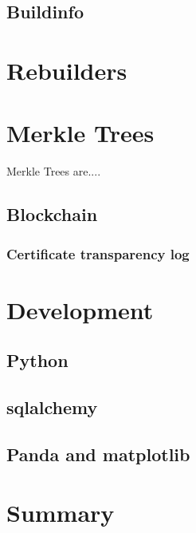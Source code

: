 \documentclass[../Main/thesis.tex]{subfiles}
\begin{document}
    \subsection*{Buildinfo}

\section{Rebuilders}\label{sec:rebuilders} 

\section{Merkle Trees}
Merkle Trees are....

    \subsection*{Blockchain}

    \subsubsection*{Certificate transparency log}


\section{Development}\label{sec:development} 
    \subsection*{Python}
    \subsection*{sqlalchemy}
    \subsection*{Panda and matplotlib}

\section{Summary}\label{sec:summary-theory} 

\blankpage
\end{document}
